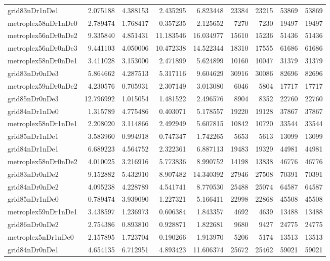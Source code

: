 \begin{longtable}{|l|r|r|r|r|r|r|r|r|}
grid83nDr1nDe1 & 2.075188 & 4.388153 & 2.435295 & 6.823448 & 23384 & 23215 & 53869 & 53869 \\
metroplex58nDr1nDe0 & 2.789474 & 1.768417 & 0.357235 & 2.125652 & 7270 & 7230 & 19497 & 19497 \\
metroplex56nDr0nDe2 & 9.335840 & 4.851431 & 11.183546 & 16.034977 & 15610 & 15236 & 51436 & 51436 \\
metroplex56nDr0nDe3 & 9.441103 & 4.050006 & 10.472338 & 14.522344 & 18310 & 17555 & 61686 & 61686 \\
metroplex58nDr0nDe1 & 3.411028 & 3.153000 & 2.471899 & 5.624899 & 10160 & 10047 & 31379 & 31379 \\
grid83nDr0nDe3 & 5.864662 & 4.287513 & 5.317116 & 9.604629 & 30916 & 30086 & 82696 & 82696 \\
metroplex59nDr0nDe2 & 4.230576 & 0.705931 & 2.307149 & 3.013080 & 6046 & 5804 & 17717 & 17717 \\
grid85nDr0nDe3 & 12.796992 & 1.015054 & 1.481522 & 2.496576 & 8904 & 8352 & 22760 & 22760 \\
grid84nDr1nDe0 & 1.315789 & 4.775486 & 0.403071 & 5.178557 & 19220 & 19128 & 37867 & 37867 \\
metroplex58nDr1nDe1 & 2.208020 & 3.114866 & 2.492949 & 5.607815 & 10842 & 10720 & 33544 & 33544 \\
grid85nDr1nDe1 & 3.583960 & 0.994918 & 0.747347 & 1.742265 & 5653 & 5613 & 13099 & 13099 \\
grid84nDr1nDe1 & 6.689223 & 4.564752 & 2.322361 & 6.887113 & 19483 & 19329 & 44981 & 44981 \\
metroplex58nDr0nDe2 & 4.010025 & 3.216916 & 5.773836 & 8.990752 & 14198 & 13838 & 46776 & 46776 \\
grid83nDr0nDe2 & 9.152882 & 5.432910 & 8.907482 & 14.340392 & 27946 & 27508 & 70391 & 70391 \\
grid84nDr0nDe2 & 4.095238 & 4.228789 & 4.541741 & 8.770530 & 25488 & 25074 & 64587 & 64587 \\
grid85nDr1nDe0 & 0.789474 & 3.939090 & 1.227321 & 5.166411 & 22998 & 22868 & 45508 & 45508 \\
metroplex59nDr1nDe1 & 3.438597 & 1.236973 & 0.606384 & 1.843357 & 4692 & 4639 & 13488 & 13488 \\
grid86nDr0nDe2 & 2.754386 & 0.893810 & 0.928871 & 1.822681 & 9680 & 9427 & 24775 & 24775 \\
metroplex5nDr1nDe0 & 2.157895 & 1.723704 & 0.190266 & 1.913970 & 5206 & 5174 & 13513 & 13513 \\
grid84nDr0nDe1 & 4.654135 & 6.712951 & 4.893423 & 11.606374 & 25672 & 25462 & 59021 & 59021 \\

\end{longtable}

